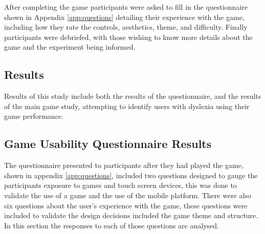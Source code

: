 \documentclass[journal]{IEEEtran}
\begin{document}
After completing the game participants were asked to fill in the questionnaire shown in Appendix \ref{app:questions} detailing their experience with the game, including how they rate the controls, aesthetics, theme, and difficulty.
Finally participants were debriefed, with those wishing to know more details about the game and the experiment being informed.

\subsection{Results}
Results of this study include both the results of the questionnaire, and the results of the main game study, attempting to identify users with dyslexia using their game performance.

\subsection{Game Usability Questionnaire Results} 
\label{sec:questionResults}

The questionnaire presented to participants after they had played the game, shown in appendix \ref{app:questions}, included two questions designed to gauge the participants exposure to games and touch screen devices, this was done to validate the use of a game and the use of the mobile platform. There were also six questions about the user's experience with the game, these questions were included to validate the design decisions included the game theme and structure. In this section the responses to each of those questions are analysed.
\end{document}

